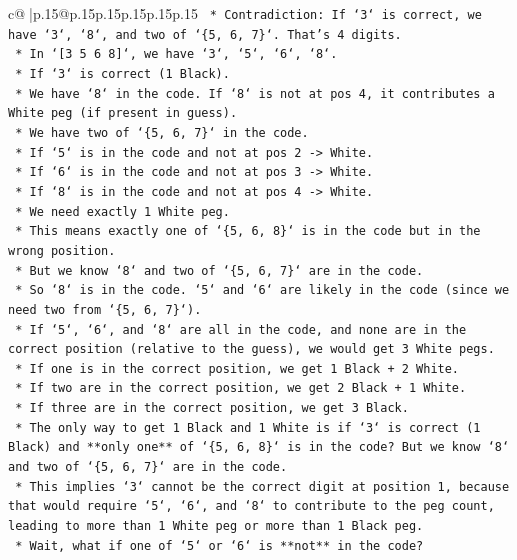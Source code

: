 \documentclass{article}
\begin{document}
{\begin{supertabular}{c@{$\;$}|p{.15\linewidth}@{}p{.15\linewidth}p{.15\linewidth}p{.15\linewidth}p{.15\linewidth}p{.15\linewidth}}
{{{\texttt{        *   Contradiction: If `3` is correct, we have `3`, `8`, and two of `\{5, 6, 7\}`. That's 4 digits.} \\
\texttt{        *   In `{[}3 5 6 8{]}`, we have `3`, `5`, `6`, `8`.} \\
\texttt{        *   If `3` is correct (1 Black).} \\
\texttt{        *   We have `8` in the code. If `8` is not at pos 4, it contributes a White peg (if present in guess).} \\
\texttt{        *   We have two of `\{5, 6, 7\}` in the code.} \\
\texttt{        *   If `5` is in the code and not at pos 2 {-}> White.} \\
\texttt{        *   If `6` is in the code and not at pos 3 {-}> White.} \\
\texttt{        *   If `8` is in the code and not at pos 4 {-}> White.} \\
\texttt{        *   We need exactly 1 White peg.} \\
\texttt{        *   This means exactly one of `\{5, 6, 8\}` is in the code but in the wrong position.} \\
\texttt{        *   But we know `8` and two of `\{5, 6, 7\}` are in the code.} \\
\texttt{        *   So `8` is in the code. `5` and `6` are likely in the code (since we need two from `\{5, 6, 7\}`).} \\
\texttt{        *   If `5`, `6`, and `8` are all in the code, and none are in the correct position (relative to the guess), we would get 3 White pegs.} \\
\texttt{        *   If one is in the correct position, we get 1 Black + 2 White.} \\
\texttt{        *   If two are in the correct position, we get 2 Black + 1 White.} \\
\texttt{        *   If three are in the correct position, we get 3 Black.} \\
\texttt{        *   The only way to get 1 Black and 1 White is if `3` is correct (1 Black) and **only one** of `\{5, 6, 8\}` is in the code? But we know `8` and two of `\{5, 6, 7\}` are in the code.} \\
\texttt{        *   This implies `3` cannot be the correct digit at position 1, because that would require `5`, `6`, and `8` to contribute to the peg count, leading to more than 1 White peg or more than 1 Black peg.} \\
\texttt{        *   Wait, what if one of `5` or `6` is **not** in the code?} \\
}}}
\end{supertabular}}
\end{document}
